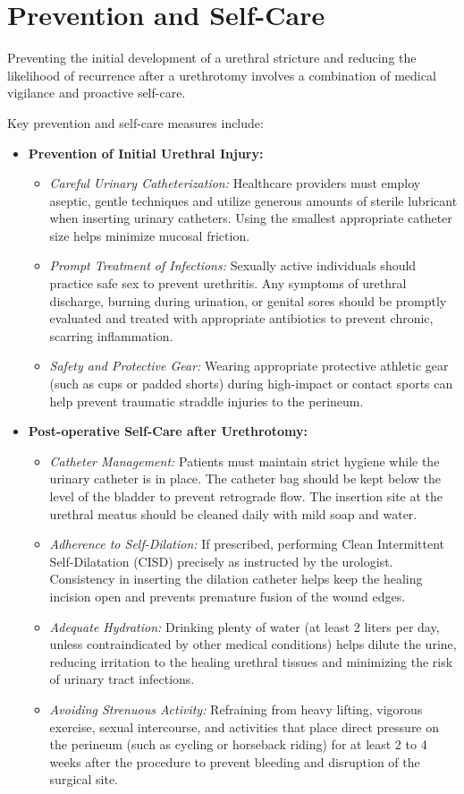 \section*{Prevention and Self-Care}
Preventing the initial development of a urethral stricture and reducing the likelihood of recurrence after a urethrotomy involves a combination of medical vigilance and proactive self-care.

Key prevention and self-care measures include:
\begin{itemize}
  \item \textbf{Prevention of Initial Urethral Injury:}
  \begin{itemize}
    \item \textit{Careful Urinary Catheterization:} Healthcare providers must employ aseptic, gentle techniques and utilize generous amounts of sterile lubricant when inserting urinary catheters. Using the smallest appropriate catheter size helps minimize mucosal friction.
    \item \textit{Prompt Treatment of Infections:} Sexually active individuals should practice safe sex to prevent urethritis. Any symptoms of urethral discharge, burning during urination, or genital sores should be promptly evaluated and treated with appropriate antibiotics to prevent chronic, scarring inflammation.
    \item \textit{Safety and Protective Gear:} Wearing appropriate protective athletic gear (such as cups or padded shorts) during high-impact or contact sports can help prevent traumatic straddle injuries to the perineum.
  \end{itemize}
  \item \textbf{Post-operative Self-Care after Urethrotomy:}
  \begin{itemize}
    \item \textit{Catheter Management:} Patients must maintain strict hygiene while the urinary catheter is in place. The catheter bag should be kept below the level of the bladder to prevent retrograde flow. The insertion site at the urethral meatus should be cleaned daily with mild soap and water.
    \item \textit{Adherence to Self-Dilation:} If prescribed, performing Clean Intermittent Self-Dilatation (CISD) precisely as instructed by the urologist. Consistency in inserting the dilation catheter helps keep the healing incision open and prevents premature fusion of the wound edges.
    \item \textit{Adequate Hydration:} Drinking plenty of water (at least 2 liters per day, unless contraindicated by other medical conditions) helps dilute the urine, reducing irritation to the healing urethral tissues and minimizing the risk of urinary tract infections.
    \item \textit{Avoiding Strenuous Activity:} Refraining from heavy lifting, vigorous exercise, sexual intercourse, and activities that place direct pressure on the perineum (such as cycling or horseback riding) for at least 2 to 4 weeks after the procedure to prevent bleeding and disruption of the surgical site.
  \end{itemize}
\end{itemize}

